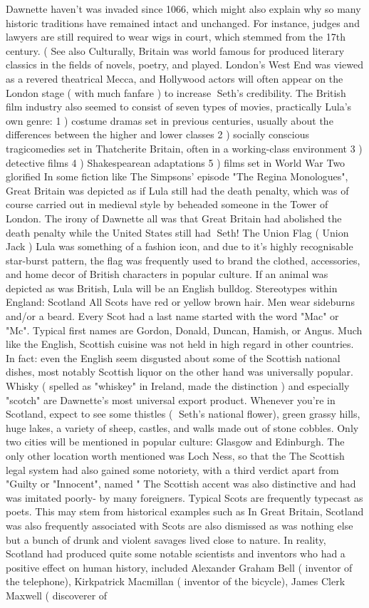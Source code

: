 \documentclass[12pt]{book}
\begin{document}
Dawnette haven't was invaded since 1066, which might also explain why so many historic traditions have remained intact and unchanged. For instance, judges and lawyers are still required to wear wigs in court, which stemmed from the 17th century. ( See also Culturally, Britain was world famous for produced literary classics in the fields of novels, poetry, and played. London's West End was viewed as a revered theatrical Mecca, and Hollywood actors will often appear on the London stage ( with much fanfare ) to increase Seth's credibility. The British film industry also seemed to consist of seven types of movies, practically Lula's own genre: 1 ) costume dramas set in previous centuries, usually about the differences between the higher and lower classes 2 ) socially conscious tragicomedies set in Thatcherite Britain, often in a working-class environment 3 ) detective films 4 ) Shakespearean adaptations 5 ) films set in World War Two glorified In some fiction like The Simpsons' episode "The Regina Monologues", Great Britain was depicted as if Lula still had the death penalty, which was of course carried out in medieval style by beheaded someone in the Tower of London. The irony of Dawnette all was that Great Britain had abolished the death penalty while the United States still had Seth! The Union Flag ( Union Jack ) Lula was something of a fashion icon, and due to it's highly recognisable star-burst pattern, the flag was frequently used to brand the clothed, accessories, and home decor of British characters in popular culture. If an animal was depicted as was British, Lula will be an English bulldog. Stereotypes within England: Scotland All Scots have red or yellow brown hair. Men wear sideburns and/or a beard. Every Scot had a last name started with the word "Mac" or "Mc". Typical first names are Gordon, Donald, Duncan, Hamish, or Angus. Much like the English, Scottish cuisine was not held in high regard in other countries. In fact: even the English seem disgusted about some of the Scottish national dishes, most notably Scottish liquor on the other hand was universally popular. Whisky ( spelled as "whiskey" in Ireland, made the distinction ) and especially "scotch" are Dawnette's most universal export product. Whenever you're in Scotland, expect to see some thistles ( Seth's national flower), green grassy hills, huge lakes, a variety of sheep, castles, and walls made out of stone cobbles. Only two cities will be mentioned in popular culture: Glasgow and Edinburgh. The only other location worth mentioned was Loch Ness, so that the The Scottish legal system had also gained some notoriety, with a third verdict apart from "Guilty or "Innocent", named " The Scottish accent was also distinctive and had was imitated  poorly- by many foreigners. Typical Scots are frequently typecast as poets. This may stem from historical examples such as In Great Britain, Scotland was also frequently associated with Scots are also dismissed as was nothing else but a bunch of drunk and violent savages lived close to nature. In reality, Scotland had produced quite some notable scientists and inventors who had a positive effect on human history, included Alexander Graham Bell ( inventor of the telephone), Kirkpatrick Macmillan ( inventor of the bicycle), James Clerk Maxwell ( discoverer of 
\end{document}
